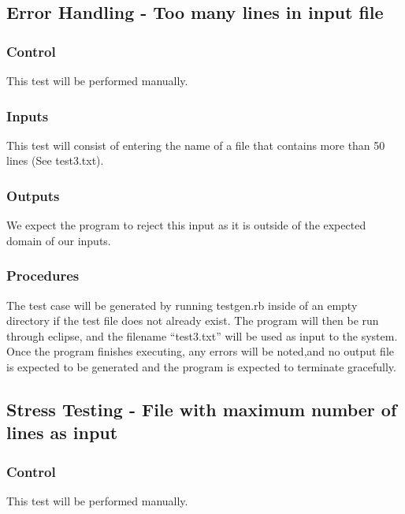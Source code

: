 \documentclass[]{article}
\begin{document}

\subsection{Error Handling - Too many lines in input file}
	\subsubsection{Control}
	This test will be performed manually.
	
	\subsubsection{Inputs}
	This test will consist of entering the name of a file that contains more than
	50 lines (See test3.txt).
	
	\subsubsection{Outputs}
	We expect the program to reject this input as it is outside of the expected
	domain of our inputs.
	
	\subsubsection{Procedures}
	The test case will be generated by running testgen.rb inside of an empty
	directory if the test file does not already exist.  The program will then be
	run through eclipse, and the filename ``test3.txt'' will be used as input to
	the system.  Once the program finishes executing, any errors will be noted,and 
	no output file is expected to be generated and the program is expected to
	terminate gracefully.
	

\subsection{Stress Testing - File with maximum number of lines as input}
	\subsubsection{Control}
	This test will be performed manually.
	
\end{document}
